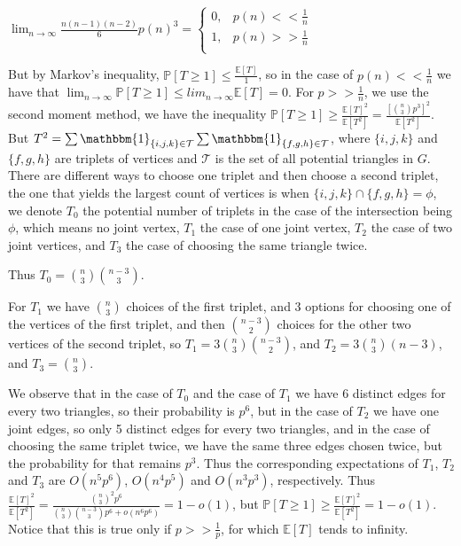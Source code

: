 \documentclass{article}
\begin{document}
$\lim_{n\rightarrow\infty}\frac{n(n-1)(n-2)}{6}p(n)^3=     \begin{cases}
       0, & p(n)<<\frac{1}{n}\\
       1, & p(n)>>\frac{1}{n}\\
     \end{cases}$

But by Markov's inequality, $\mathbb{P}[T\geq{1}]\leq\frac{\mathbb{E}[T]}{1}$, so in the case of $p(n)<<\frac{1}{n}$ we have that $\lim_{n\rightarrow\infty}\mathbb{P}[T\geq{1}]\leq{lim_{n\rightarrow\infty}\mathbb{E}[T]=0}$.
For $p>>\frac{1}{n}$, we use the second moment method, we have the inequality $\mathbb{P}[T\geq{1}]\geq{\frac{\mathbb{E}[T]^2}{\mathbb{E}[T^2]}}=\frac{[\binom{n}{3}p^3]^2}{\mathbb{E}[T^2]}$. But $T^2=\sum\mathbbm{1}_{\{i,j,k\}\in\mathcal{T}}\sum\mathbbm{1}_{\{f,g,h\}\in\mathcal{T}}$, where $\{i,j,k\}$ and $\{f,g,h\}$ are triplets of vertices and $\mathcal{T}$ is the set of all potential triangles in $G$. There are different ways to choose one triplet and then choose a second triplet, the one that yields the largest count of vertices is when $\{i,j,k\}\cap\{f,g,h\}=\phi$, we denote $T_0$ the potential number of triplets in the case of the intersection being $\phi$, which means no joint vertex, $T_1$ the case of one joint vertex, $T_2$ the case of two joint vertices, and $T_3$ the case of choosing the same triangle twice.

Thus $T_0=\binom{n}{3}\binom{n-3}{3}$. 

For $T_1$ we have $\binom{n}{3}$ choices of the first triplet, and $3$ options for choosing one of the vertices of the first triplet, and then $\binom{n-3}{2}$ choices for the other two vertices of the second triplet, so $T_1=3\binom{n}{3}\binom{n-3}{2}$, and $T_2=3\binom{n}{3}(n-3)$, and $T_3=\binom{n}{3}$. 

We observe that in the case of $T_0$ and the case of $T_1$ we have $6$ distinct edges for every two triangles, so their probability is $p^6$, but in the case of $T_2$ we have one joint edges, so only 5 distinct edges for every two triangles, and in the case of choosing the same triplet twice, we have the same three edges chosen twice, but the probability for that remains $p^3$. Thus the corresponding expectations of $T_1$, $T_2$ and $T_3$ are $O(n^5p^6)$, $O(n^4p^5)$ and $O(n^3p^3)$, respectively. Thus $\frac{\mathbb{E}[T]^2}{\mathbb{E}[T^2]}=\frac{\binom{n}{3}^2p^6}{\binom{n}{3}\binom{n-3}{3}p^6+o(n^6p^6)}=1-o(1)$, but $\mathbb{P}[T\geq{1}]\geq\frac{\mathbb{E}[T]^2}{\mathbb{E}[T^2]}=1-o(1)$. Notice that this is true only if $p>>\frac{1}{p}$, for which $\mathbb{E}[T]$ tends to infinity.
\end{document}
